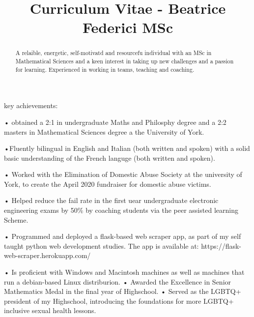 \documentclass{article}
\begin{document}
\title{Curriculum Vitae - Beatrice Federici MSc}

\maketitle


\begin{abstract}
  A relaible, energetic, self-motivatd and resourcefu individual with an MSc in Mathematical
  Sciences and a keen interest in taking up new challenges and a passion for learning.
  Experienced in working in teams, teaching and coaching.
\end{abstract}

\begin{section}
key achievements:\par
• obtained a 2:1 in undergraduate Maths and Philosphy degree and a 2:2 masters in Mathematical Sciences degree a the University of York.\par•Fluently bilingual in English and Italian (both written and spoken) with a solid basic understanding of the French languge (both written and spoken).\par
• Worked with the Elimination of Domestic Abuse Society at the university of York, to create the April 2020 fundraiser for domestic abuse victims.\par
• Helped reduce the fail rate in the first uear undergraduate electronic engineering exams by 50\% by coaching students via the peer assisted learning Scheme.\par
• Programmed and deployed a flask-based web scraper app, as part of my self taught python web development studies. The app is available at:
https://flask-web-scraper.herokuapp.com/ \par
• Is proficient with Windows and Macintosh machines as well as machines that run a debian-based Linux distriburion.
• Awarded the Excellence in Senior Mathematics Medal in the final year of Highschool.
• Served as the LGBTQ+ president of my Highschool, introducing the foundations for more LGBTQ+ inclusive sexual health lessons.
\end{section}
\end{document}
